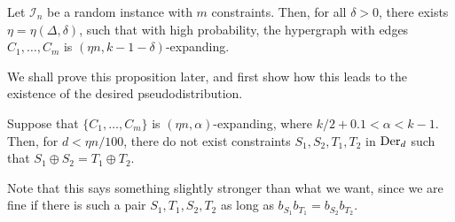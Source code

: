 	\begin{fprop}
		Let $\mathcal{I}_n$ be a random instance with $m$ constraints. Then, for all $\delta > 0$, there exists $\eta = \eta(\Delta,\delta)$, such that with high probability, the hypergraph with edges $C_1,\ldots,C_m$ is $(\eta n,k-1-\delta)$-expanding.
	\end{fprop}
	We shall prove this proposition later, and first show how this leads to the existence of the desired pseudodistribution.

	\begin{flem}
		Suppose that $\{C_1,\ldots,C_m\}$ is $(\eta n, \alpha)$-expanding, where $k/2 + 0.1 < \alpha < k-1$. Then, for $d < \eta n/100$, there do not exist constraints $S_1,S_2,T_1,T_2$ in $\operatorname{Der}_d$ such that $S_1 \oplus S_2 = T_1 \oplus T_2$. 
	\end{flem}
	Note that this says something slightly stronger than what we want, since we are fine if there is such a pair $S_1,T_1,S_2,T_2$ as long as $b_{S_1} b_{T_1} = b_{S_2} b_{T_2}$.
